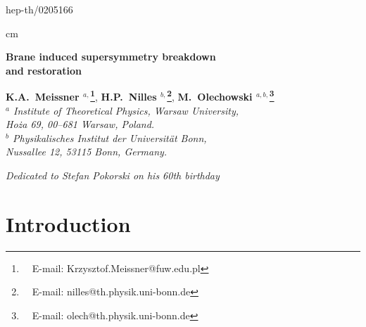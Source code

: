 \documentclass[a4paper,12pt]{article}
\def\ZZ{\mathbb Z}
\begin{document}
\begin{flushright}
hep-th/0205166
\end{flushright}

 cm
\begin{center}
{\Large {\bf Brane induced supersymmetry breakdown 
\\[12pt]
and restoration}} 

\vspace{12mm}
{\large
{\bf K.A.\ Meissner ${}^{a,}$\footnote{
\ \ E-mail: Krzysztof.Meissner@fuw.edu.pl}}, 
{\bf H.P.\ Nilles ${}^{b,}$\footnote{
\ \ E-mail: nilles@th.physik.uni-bonn.de}},
{\bf M.\ Olechowski ${}^{a,b,}$\footnote{
\ \ E-mail: olech@th.physik.uni-bonn.de}
}}\\
\vspace{4mm}
{\it ${}^a$ Institute of Theoretical Physics, Warsaw University,} \\
{\it Ho\.za 69, 00--681 Warsaw, Poland.}\\
\vspace{4mm}
{\it ${}^b$ Physikalisches Institut der Universit\"at Bonn,} \\
{\it Nussallee 12, 53115 Bonn, Germany.}\\
\end{center}


\begin{center}
\vspace{10mm}
{\sl Dedicated to Stefan Pokorski on his 60th birthday}
\end{center}

\vspace{10mm}
\begin{abstract}
We investigate the phenomenon of brane induced supersymmetry breakdown
on orbifolds in the presence of a Scherk--Schwarz mechanism. General
consistency conditions are derived for arbitrary dimensions and the
results are illustrated in the specific example of a 5--dimensional
theory compactified on $S^1/\ZZ_2$. This includes a discussion of the
Kaluza--Klein spectrum and the possibility of a brane induced
supersymmetry restoration.
\end{abstract}

\newpage
\section{Introduction}
\end{document}
